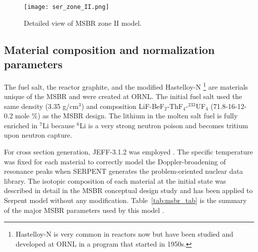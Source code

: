 \begin{figure}[hbp!] %
  \centering
  \vspace{-0.3em}
  \texttt{[image: ser\_zone\_II.png]}
  \caption{Detailed view of \gls{MSBR} zone II model.}
  \vspace{-0.6em}
  \label{fig:serpent_zoneII}
\end{figure}
\FloatBarrier

\subsection{Material composition and normalization parameters}
The fuel salt, the reactor graphite, and the modified Hastelloy-N \footnote{Hastelloy-N is very common in reactors now but have been studied and developed at \gls{ORNL} in a program that started in 1950s.} are materials unique of the \gls{MSBR} and were created at \gls{ORNL}. The initial fuel salt used the same density (3.35 g/cm$^3$) and composition LiF-BeF$_2$-ThF$_4$-$^{233}$UF$_4$ (71.8-16-12-0.2 mole \%) as the \gls{MSBR} design\cite{robertson_conceptual_1971}. The lithium in the molten salt fuel is fully enriched in $^{7}$Li because $^{6}$Li is a very strong neutron poison and becomes tritium upon neutron capture. 

For cross section generation, JEFF-3.1.2 was employed \cite{oecd/nea_data_bank_jeff-3.1.2_2014}. The specific temperature was fixed for each material to correctly model the Doppler-broadening of resonance peaks when SERPENT generates the problem-oriented nuclear data library. The isotopic composition of each material at the initial state was described in detail in the MSBR conceptual design study \cite{robertson_conceptual_1971} and has been applied to Serpent model without any modification. Table~\ref{tab:msbr_tab} is the summary of the major \gls{MSBR} parameters used by this model \cite{robertson_conceptual_1971}. 

